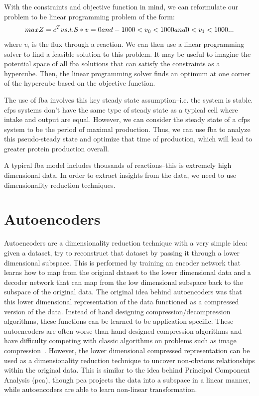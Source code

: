 With the constraints and objective function in mind, we can reformulate our problem to be linear programming problem of the form:
\begin{equation}
max Z = c^Tv \\
s.t. S * v = 0 \\
and -1000 < v_0 < 1000 \\
and 0 < v_1 < 1000 \\
...
\end{equation}
where $v_i$ is the flux through a reaction.
We can then use a linear programming solver to find a feasible solution to this problem.
It may be useful to imagine the potential space of all \gls{fba} solutions that can satisfy the constraints as a hypercube.
Then, the linear programming solver finds an optimum at one corner of the hypercube based on the objective function.

The use of \gls{fba} involves this key steady state assumption--i.e. the system is stable.
\gls{cfps} systems don't have the same type of steady state as a typical cell where intake and output are equal.
However, we can consider the steady state of a \gls{cfps} system to be the period of maximal production.
Thus, we can use \gls{fba} to analyze this pseudo-steady state and optimize that time of production, which will lead to greater protein production overall.

A typical \gls{fba} model includes thousands of reactions--this is extremely high dimensional data.
In order to extract insights from the data, we need to use dimensionality reduction techniques.

\section{Autoencoders}
Autoencoders are a dimensionality reduction technique with a very simple idea: given a dataset, try to reconstruct that dataset by passing it through a lower dimensional subspace.
This is performed by training an encoder network that learns how to map from the original dataset to the lower dimensional data and a decoder network that can map from the low dimensional subspace back to the subspace of the original data.
The original idea behind autoencoders was that this lower dimensional representation of the data functioned as a compressed version of the data.
Instead of hand designing compression/decompression algorithms, these functions can be learned to be application specific.
These autoencoders are often worse than hand-designed compression algorithms and have difficulty competing with classic algorithms on problems such as image compression~\cite{theis2017lossy}.
However, the lower dimensional compressed representation can be used as a dimensionality reduction technique to uncover non-obvious relationships within the original data.
This is similar to the idea behind Principal Component Analysis (\gls{pca}), though \gls{pca} projects the data into a subspace in a linear manner, while autoencoders are able to learn non-linear transformation.

